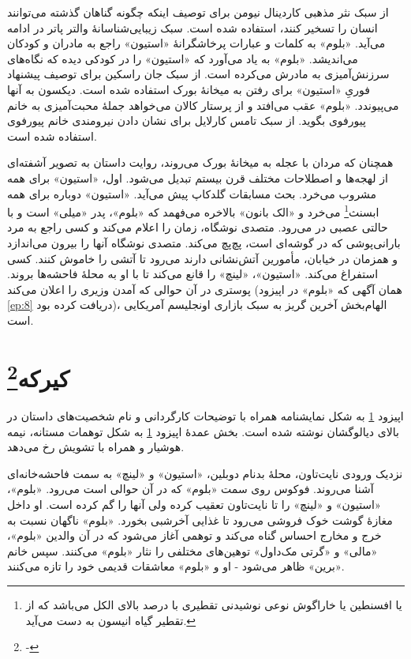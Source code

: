 \documentclass[12pt]{book}
\newcommand{\noun}[1]{«{#1}»}
\begin{document}
    از سبک نثر مذهبی کاردینال نیومن برای توصیف اینکه چگونه گناهان گذشته می‌توانند انسان را تسخیر کنند، استفاده شده است. سبک زیبایی‌شناسانۀ والتر پاتر در ادامه می‌آید. \noun{بلوم} به کلمات و عبارات پرخاشگرانۀ \noun{استیون} راجع به مادران و کودکان می‌اندیشد. \noun{بلوم} به یاد می‌آورد که \noun{استیون} را در کودکی دیده که نگاه‌های سرزنش‌آمیزی به مادرش می‌کرده است. از سبک جان راسکین برای توصیف پیشنهاد فوریِ \noun{استیون} برای رفتن به میخانۀ بورک استفاده شده است. دیکسون به آنها می‌پیوندد. \noun{بلوم} عقب می‌افتد و از پرستار کالان می‌خواهد جملۀ محبت‌آمیزی به خانم پیورفوی بگوید. از سبک تامس کارلایل برای نشان دادن نیرومندی خانم پیورفوی استفاده شده است.

    همچنان که مردان با عجله به میخانۀ بورک می‌روند، روایت داستان به تصویر آشفته‌ای از لهجه‌ها و اصطلاحات مختلف قرن بیستم تبدیل می‌شود. اول، \noun{استیون} برای همه مشروب می‌خرد. بحث مسابقات گلدکاپ پیش می‌آید. \noun{استیون} دوباره برای همه ابسنث\footnote{یا افسنطین یا خاراگوش نوعی نوشیدنی تقطیری با درصد بالای الکل می‌باشد که از تقطیر گیاه انیسون به دست می‌آید.} می‌خرد و \noun{الک بانون} بالاخره می‌فهمد که \noun{بلوم}، پدر \noun{میلی} است و با حالتی عصبی در می‌رود. متصدی نوشگاه، زمان را اعلام می‌کند و کسی راجع به مرد بارانی‌پوشی که در گوشه‌ای است، پچ‌پچ می‌کند. متصدی نوشگاه آنها را بیرون می‌اندازد و همزمان در خیابان، مأمورین آتش‌نشانی دارند می‌رود تا آتشی را خاموش کنند. کسی استفراغ می‌کند. \noun{استیون}، \noun{لینچ} را قانع می‌کند تا با او به محلۀ فاحشه‌ها بروند. پوستری در آن حوالی که آمدن وزیری را اعلان می‌کند (همان آگهی که \noun{بلوم} در اپیزود \ref{ep:8} دریافت کرده بود)، الهام‌بخش آخرین گریز به سبک بازاری اونجلیسم آمریکایی است.

    \chapter[کیرکه]{کیرکه\protect\footnote{-}}\label{ep:15}
    اپیزود \ref{ep:15} به شکل نمایشنامه همراه با توضیحات کارگردانی و نام شخصیت‌های داستان در بالای دیالوگشان نوشته شده است. بخش عمدۀ اپیزود \ref{ep:15} به شکل توهمات مستانه، نیمه هوشیار و همراه با تشویش رخ می‌دهد.

    نزدیک ورودی نایت‌تاون، محلۀ بدنام دوبلین، \noun{استیون} و \noun{لینچ} به سمت فاحشه‌خانه‌ای آشنا می‌روند. فوکوس روی سمت \noun{بلوم} که در آن حوالی است می‌رود. \noun{بلوم}، \noun{استیون} و \noun{لینچ} را تا نایت‌تاون تعقیب کرده ولی آنها را گم کرده است. او داخل مغازۀ گوشت خوک فروشی می‌رود تا غذایی آخرشبی بخورد. \noun{بلوم} ناگهان نسبت به خرج و مخارج احساس گناه می‌کند و توهمی آغاز می‌شود که در آن والدین \noun{بلوم}، \noun{مالی} و \noun{گرتی مک‌داول‬} توهین‌های مختلفی را نثار \noun{بلوم} می‌کنند. سپس خانم \noun{برین} ظاهر می‌شود - او و \noun{بلوم} معاشقات قدیمی خود را تازه می‌کنند.
\end{document}
